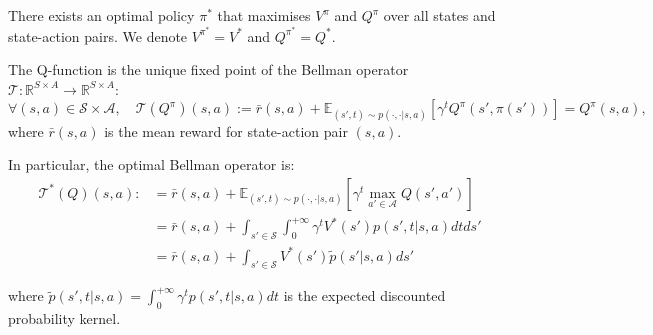 \documentclass{article}
\begin{document}
There exists an optimal policy $\pi^*$ that maximises $V^{\pi}$ and $Q^{\pi}$ over all states and state-action pairs. We denote $V^{\pi^*} = V^*$ and $Q^{\pi^*} = Q^*$.

The Q-function is the unique fixed point of the Bellman operator $\mathcal{T}: \mathbb{R}^{S \times A} \to \mathbb{R}^{S \times A}$:
$$\forall (s, a) \in \mathcal{S} \times \mathcal{A}, \quad \mathcal{T}(Q^{\pi})(s, a) := \bar r(s, a) + \mathbb{E}_{(s', t) \sim p(\cdot, \cdot | s, a)} \left[ \gamma^t Q^{\pi}(s', \pi(s')) \right] = Q^{\pi}(s, a),$$
where $\bar r(s, a)$ is the mean reward for state-action pair $(s, a)$.

In particular, the optimal Bellman operator is:
\begin{align*}
  \mathcal{T^*}(Q)(s, a) :&= \bar r(s, a) + \mathbb{E}_{(s', t) \sim p(\cdot, \cdot | s, a)} \left[ \gamma^t \max_{a' \in \mathcal{A}} Q(s', a') \right]\\
  &= \bar r(s, a) + \int_{s' \in \mathcal{S}} \int_0^{+ \infty} \gamma^t V^*(s') p(s', t | s, a) dt ds' \\
  &= \bar r(s, a) + \int_{s' \in \mathcal{S}} V^*(s') \tilde p(s' | s, a) ds'
\end{align*}

where $\tilde p(s', t | s, a) = \int_0^{+\infty} \gamma^t p(s', t | s, a) dt$ is the expected discounted probability kernel.
\end{document}
